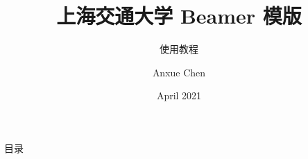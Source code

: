 \documentclass[xcolor=table,dvipsnames,svgnames,aspectratio=169]{ctexbeamer}
\title[SJTU Beamer Template] %
{\textbf{上海交通大学 Beamer 模版}} %
\subtitle{使用教程}
\author[Anxue Chen]
{Anxue Chen}
\institute[SJTU]{Shanghai Jiao Tong University}
\date{April 2021}
\begin{document}
\frame{\titlepage}

\begin{frame}{目录}
	\tableofcontents
\end{frame}


\end{document}
